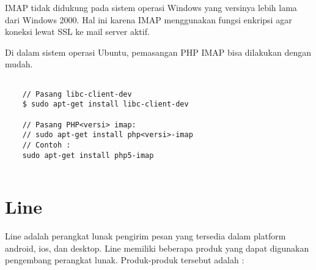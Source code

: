 IMAP tidak didukung pada sistem operasi Windows yang versinya lebih lama dari Windows 2000. Hal ini karena IMAP menggunakan fungsi enkripsi agar koneksi lewat SSL ke mail server aktif.

Di dalam sistem operasi Ubuntu, pemasangan PHP IMAP bisa dilakukan dengan mudah.
\begin{lstlisting}
	
	// Pasang libc-client-dev
	$ sudo apt-get install libc-client-dev

	// Pasang PHP<versi> imap:
	// sudo apt-get install php<versi>-imap
	// Contoh : 
	sudo apt-get install php5-imap
		
\end{lstlisting}

\section{Line \cite{LINE-developer}}
\label{sec:Line}
Line adalah perangkat lunak pengirim pesan yang tersedia dalam platform android, ios, dan desktop. Line memiliki beberapa produk yang dapat digunakan pengembang perangkat lunak. Produk-produk tersebut adalah :
